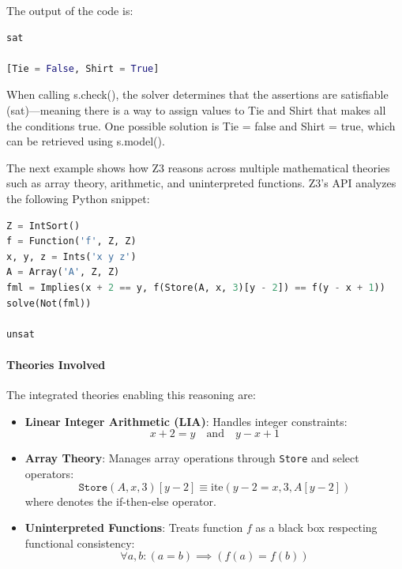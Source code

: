 \documentclass[]{rptuseminar}
\begin{document}
\vspace{1em}
The output of the code is:
\begin{lstlisting}[language=Python]
sat

[Tie = False, Shirt = True]
\end{lstlisting}
\vspace{1em}


When calling s.check(), the solver determines that the assertions are satisfiable (sat)—meaning there is a way to assign values to Tie and Shirt that makes all the conditions true. One possible solution is Tie = false and Shirt = true, which can be retrieved using s.model().
\vspace{1em}



The next example shows how Z3 reasons across multiple mathematical theories such as array theory, arithmetic, and uninterpreted functions. Z3's API analyzes the following Python snippet:


\begin{lstlisting}[language=Python]
Z = IntSort()
f = Function('f', Z, Z)
x, y, z = Ints('x y z')
A = Array('A', Z, Z)
fml = Implies(x + 2 == y, f(Store(A, x, 3)[y - 2]) == f(y - x + 1))
solve(Not(fml))

unsat
\end{lstlisting}



\paragraph{Theories Involved}
The integrated theories enabling this reasoning are:

\begin{itemize}
    \item \textbf{Linear Integer Arithmetic (LIA)}: Handles integer constraints:
    \begin{equation*}
        x + 2 = y \quad \text{and} \quad y - x + 1
    \end{equation*}
    
    \item \textbf{Array Theory}: Manages array operations through \texttt{Store} and select operators:
    \begin{equation*}
        \texttt{Store}(A, x, 3)[y - 2] \equiv \text{ite}(y - 2 = x, 3, A[y - 2])
    \end{equation*}
    where  denotes the if-then-else operator.
    
    \item \textbf{Uninterpreted Functions}: Treats function $f$ as a black box respecting functional consistency:
    \begin{equation*}
        \forall a, b: (a = b) \implies (f(a) = f(b))
    \end{equation*}
\end{itemize}
\end{document}
